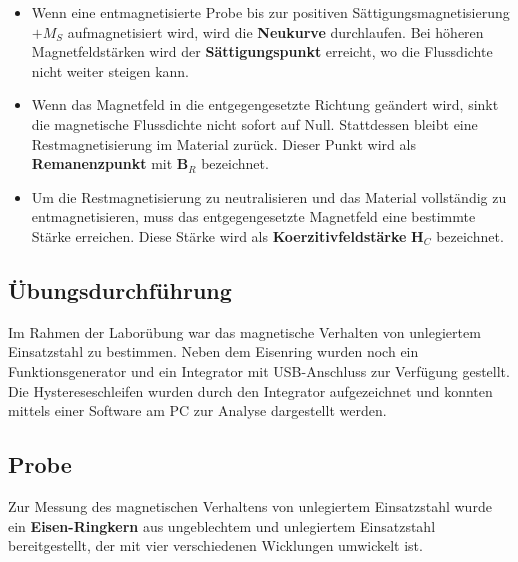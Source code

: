 \documentclass[a4paper,twoside,12pt,DIV=13,BCOR=5mm,numbers=noenddot,cleardoublepage=empty]{scrbook}
\begin{document}
    \begin{itemize}
        \item Wenn eine entmagnetisierte Probe bis zur positiven Sättigungsmagnetisierung $+M_S$ aufmagnetisiert wird, wird die \textbf{Neukurve} durchlaufen. Bei höheren Magnetfeldstärken wird der \textbf{Sättigungspunkt} erreicht, wo die Flussdichte nicht weiter steigen kann.
        \item Wenn das Magnetfeld in die entgegengesetzte Richtung geändert wird, sinkt die magnetische Flussdichte nicht sofort auf Null. Stattdessen bleibt eine Restmagnetisierung im Material zurück. Dieser Punkt wird als \textbf{Remanenzpunkt} mit \textbf{B$_R$} bezeichnet.
        \item Um die Restmagnetisierung zu neutralisieren und das Material vollständig zu entmagnetisieren, muss das entgegengesetzte Magnetfeld eine bestimmte Stärke erreichen. Diese Stärke wird als \textbf{Koerzitivfeldstärke} \textbf{H$_C$} bezeichnet. \\
    \end{itemize}
    
    \subsection{Übungsdurchführung}
    
    Im Rahmen der Laborübung war das magnetische Verhalten von unlegiertem Einsatzstahl zu bestimmen. Neben dem Eisenring wurden noch ein Funktionsgenerator und ein Integrator mit USB-Anschluss zur Verfügung gestellt. Die Hystereseschleifen wurden durch den Integrator aufgezeichnet und konnten mittels einer Software am PC zur Analyse dargestellt werden.

    \newpage
    
    \subsection{Probe}

    Zur Messung des magnetischen Verhaltens von unlegiertem Einsatzstahl wurde ein \textbf{Eisen-Ringkern} aus ungeblechtem und unlegiertem Einsatzstahl bereitgestellt, der mit vier verschiedenen Wicklungen umwickelt ist.
\end{document}
